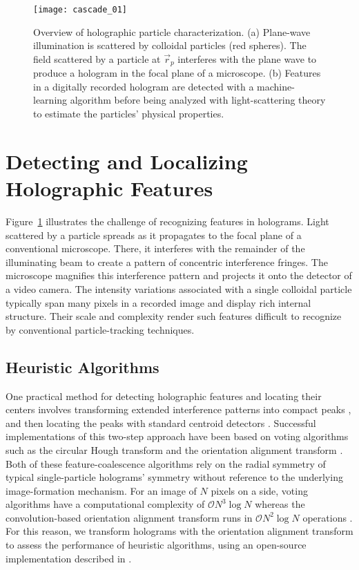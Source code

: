 \begin{figure}[b!]
  \centering
  \texttt{[image: cascade\_01]}	
  \caption{Overview of holographic particle characterization. (a) Plane-wave 
  illumination is scattered by colloidal particles (red spheres). The 
  field scattered by a particle at $\vec{r}_p$ interferes with the plane wave
  to produce a hologram in the focal
  plane of a microscope.
  (b) Features in a digitally recorded hologram are
  detected with a machine-learning algorithm before being
  analyzed with light-scattering 
  theory to estimate the particles' physical properties.}
  \label{fig:characterization}
\end{figure}

\section{Detecting and Localizing Holographic Features}

Figure~\ref{fig:characterization} illustrates the challenge of
recognizing features in holograms.
Light scattered by a particle 
spreads as it propagates to the focal plane of a conventional
microscope.
There, it interferes with the remainder of the illuminating beam
to create a pattern of concentric interference fringes.
The microscope magnifies this interference pattern and
projects it onto
the detector of a video camera.
The intensity variations
associated with a single colloidal particle
typically span many pixels in a recorded image
and display rich internal structure.
Their scale and complexity render such features difficult to
recognize by conventional
particle-tracking techniques.
  
\subsection{ Heuristic Algorithms}
\label{sec:heuristic}

One practical method for detecting holographic features and 
locating their centers involves transforming extended interference
patterns into compact peaks \cite{cheong09,krishnatreya14a}, and 
then locating the peaks with standard centroid detectors 
\cite{crocker96,allan16trackpy}. 
Successful implementations of this two-step
approach have been based on
voting algorithms such as the circular Hough transform
\cite{cheong09,parthasarathy12,allan16trackpy} and
the orientation alignment transform \cite{krishnatreya14a}.
Both of these feature-coalescence algorithms rely on the
radial symmetry of typical single-particle holograms'
symmetry without reference to the underlying image-formation
mechanism.
For an image of $N$ pixels on a side, voting algorithms
have a computational complexity of $\mathcal{O}{N^3 \log N}$ %
\cite{hollitt13} whereas the convolution-based orientation alignment
transform
runs in $\mathcal{O}{N^2 \log N}$ operations \cite{cheong09}. %
For this reason, we transform holograms with the
orientation alignment transform
to assess the performance of heuristic algorithms,
using an open-source implementation described
in \cite{cheong09}.

